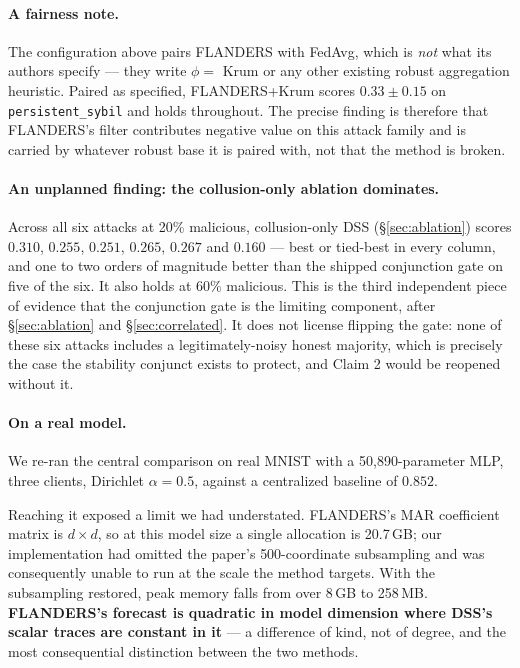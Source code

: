\documentclass[11pt,a4paper]{article}
\begin{document}
\paragraph{A fairness note.} The configuration above pairs FLANDERS with
FedAvg, which is \emph{not} what its authors specify --- they write
$\phi = $ Krum or any other existing robust aggregation heuristic. Paired
as specified, FLANDERS+Krum scores $0.33 \pm 0.15$ on
\texttt{persistent\_sybil} and holds throughout. The precise finding is
therefore that FLANDERS's filter contributes negative value on this
attack family and is carried by whatever robust base it is paired with,
not that the method is broken.

\paragraph{An unplanned finding: the collusion-only ablation dominates.}
Across all six attacks at 20\% malicious, collusion-only DSS
(\S\ref{sec:ablation}) scores $0.310$, $0.255$, $0.251$, $0.265$,
$0.267$ and $0.160$ --- best or tied-best in every column, and one to two
orders of magnitude better than the shipped conjunction gate on five of
the six. It also holds at 60\% malicious. This is the third independent
piece of evidence that the conjunction gate is the limiting component,
after \S\ref{sec:ablation} and \S\ref{sec:correlated}. It does not
license flipping the gate: none of these six attacks includes a
legitimately-noisy honest majority, which is precisely the case the
stability conjunct exists to protect, and Claim 2 would be reopened
without it.

\paragraph{On a real model.} We re-ran the central comparison on real
MNIST with a 50{,}890-parameter MLP, three clients, Dirichlet
$\alpha = 0.5$, against a centralized baseline of $0.852$.

Reaching it exposed a limit we had understated. FLANDERS's MAR
coefficient matrix is $d \times d$, so at this model size a single
allocation is 20.7\,GB; our implementation had omitted the paper's
500-coordinate subsampling and was consequently unable to run at the
scale the method targets. With the subsampling restored, peak memory
falls from over 8\,GB to 258\,MB. \textbf{FLANDERS's forecast is
quadratic in model dimension where DSS's scalar traces are constant in
it} --- a difference of kind, not of degree, and the most consequential
distinction between the two methods.
\end{document}
